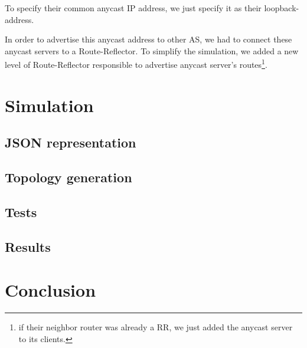 \documentclass[letter, 9pt, conference]{ieeeconf}
\begin{document}
To specify their common anycast IP address, we just specify it as their loopback-address. 

In order to advertise this anycast address to other AS, we had to connect these anycast servers to a Route-Reflector. To simplify the simulation, we added a new level of Route-Reflector responsible to advertise anycast server's routes\footnote{if their neighbor router was already a RR, we just added the anycast server to its clients.}. 

\section{Simulation}
\label{sec:simulation}

\subsection{JSON representation}

\subsection{Topology generation}

\subsection{Tests}

\subsection{Results}

\section{Conclusion}


\addtolength{\textheight}{-10cm}   %

\end{document}
